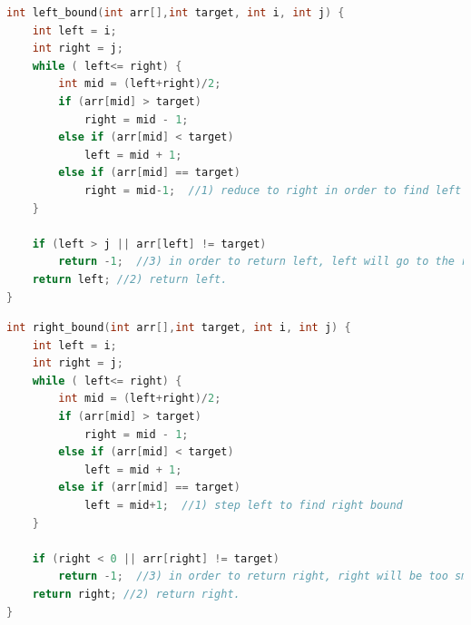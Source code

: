 \documentclass[a4paper,11pt,twoside]{book}
\begin{document}
\begin{lstlisting}[frame=single, language=c++]
int left_bound(int arr[],int target, int i, int j) {
	int left = i;
	int right = j;
	while ( left<= right) {
		int mid = (left+right)/2;
		if (arr[mid] > target)
			right = mid - 1;
		else if (arr[mid] < target)
			left = mid + 1;
		else if (arr[mid] == target)
			right = mid-1;  //1) reduce to right in order to find left bound
	}
	
	if (left > j || arr[left] != target)
		return -1;  //3) in order to return left, left will go to the right boundary, 
	return left; //2) return left.   
}
\end{lstlisting}	


\begin{lstlisting}[frame=single, language=c++]
int right_bound(int arr[],int target, int i, int j) {
	int left = i;
	int right = j;
	while ( left<= right) {
		int mid = (left+right)/2;
		if (arr[mid] > target)
			right = mid - 1;
		else if (arr[mid] < target)
			left = mid + 1;
		else if (arr[mid] == target)
			left = mid+1;  //1) step left to find right bound
	}
	
	if (right < 0 || arr[right] != target)
		return -1;  //3) in order to return right, right will be too small
	return right; //2) return right.   
}	
\end{lstlisting}
	
\end{document}
